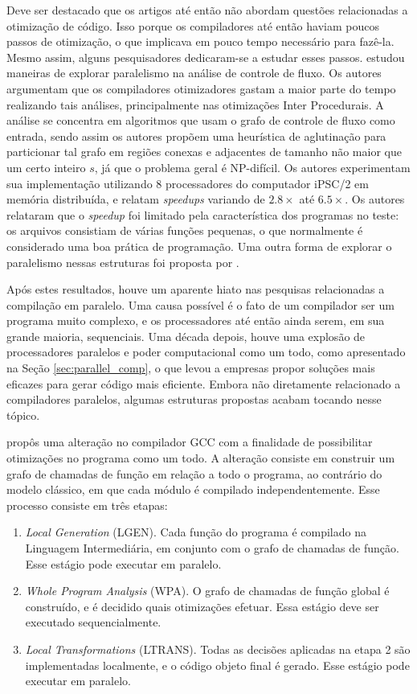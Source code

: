 Deve ser destacado que os artigos até então não abordam questões relacionadas
a otimização de código. Isso porque os compiladores até então haviam poucos
passos de otimização, o que implicava em pouco tempo necessário para fazê-la.
Mesmo assim, alguns pesquisadores dedicaram-se a estudar esses passos.
\cite{Lee1994} estudou maneiras de explorar paralelismo na análise de controle
de fluxo. Os autores argumentam que os compiladores otimizadores gastam a maior
parte do tempo realizando tais análises, principalmente nas otimizações Inter
Procedurais. A análise se concentra em algoritmos que usam o grafo de controle
de fluxo como entrada, sendo assim os autores propõem uma heurística de aglutinação
para particionar tal grafo em regiões conexas e adjacentes de tamanho não maior
que um certo inteiro $s$, já que o
problema geral é NP-difícil. Os autores experimentam sua implementação utilizando
8 processadores do computador iPSC/2 em memória distribuída, e 
relatam \textit{speedups} variando de
$2.8 \times$ até $6.5\times$. Os autores relataram que o \textit{speedup} foi
limitado pela característica dos programas no teste: os arquivos consistiam
de várias funções pequenas, o que normalmente é considerado uma boa prática de
programação. Uma outra forma de explorar o paralelismo nessas estruturas
foi proposta por \cite{kramer1994combining}.

Após estes resultados, houve um aparente hiato nas pesquisas relacionadas a
compilação em paralelo. Uma causa possível é o fato de um compilador ser
um programa muito complexo, e os processadores até então ainda serem, em sua grande
maioria, sequenciais. Uma década depois, houve uma explosão de processadores
paralelos e poder computacional como um todo, como apresentado na Seção
\ref{sec:parallel_comp}, o que levou a empresas propor soluções mais eficazes para
gerar código mais eficiente. Embora não diretamente relacionado a compiladores paralelos,
algumas estruturas propostas acabam tocando nesse tópico.

\cite{whoprgoogle} propôs uma alteração no
compilador GCC com a finalidade
de possibilitar otimizações no programa como um todo. A alteração consiste
em construir um grafo de chamadas de função em relação a todo o programa,
ao contrário do modelo clássico, em que cada módulo é compilado independentemente.
Esse processo consiste em três etapas:
\begin{enumerate}
    \item \textit{Local Generation } (LGEN). Cada função do programa é compilado
        na Linguagem Intermediária, em conjunto com o grafo de chamadas de função.
        Esse estágio pode executar em paralelo.

    \item \textit{Whole Program Analysis} (WPA). O grafo de chamadas de função global
        é construído, e é decidido quais otimizações efetuar. Essa estágio
        deve ser executado sequencialmente.

    \item \textit{Local Transformations} (LTRANS). Todas as decisões aplicadas na
        etapa 2 são implementadas localmente, e o código objeto final é gerado.
        Esse estágio pode executar em paralelo.
\end{enumerate}

